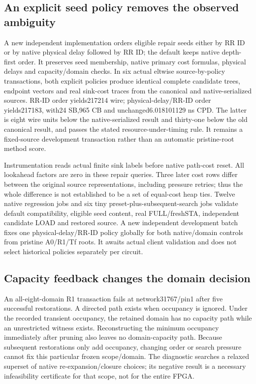 \documentclass[conference,10pt]{IEEEtran}
\begin{document}
\subsection{An explicit seed policy removes the observed ambiguity}
A new independent implementation orders eligible repair seeds either by RR ID or by native physical delay followed by RR ID; the default keeps native depth-first order. It preserves seed membership, native primary cost formulas, physical delays and capacity/domain checks. In six actual eltwise source-by-policy transactions, both explicit policies produce identical complete candidate trees, endpoint vectors and real sink-cost traces from the canonical and native-serialized sources. RR-ID order yields217214 wire; physical-delay/RR-ID order yields217183, with24 SB,965 CB and unchanged6.018101129 ns CPD. The latter is eight wire units below the native-serialized result and thirty-one below the old canonical result, and passes the stated resource-under-timing rule. It remains a fixed-source development transaction rather than an automatic pristine-root method score.

Instrumentation reads actual finite sink labels before native path-cost reset. All lookahead factors are zero in these repair queries. Three later cost rows differ between the original source representations, including pressure retries; thus the whole difference is not established to be a set of equal-cost heap ties. Twelve native regression jobs and six tiny preset-plus-subsequent-search jobs validate default compatibility, eligible seed content, real FULL/freshSTA, independent candidate LOAD and restored source. A new independent development batch fixes one physical-delay/RR-ID policy globally for both native/domain controls from pristine A0/R1/Tf roots. It awaits actual client validation and does not select historical policies separately per circuit.

\subsection{Capacity feedback changes the domain decision}
An all-eight-domain R1 transaction fails at network31767/pin1 after five successful restorations. A directed path exists when occupancy is ignored. Under the recorded transient occupancy, the retained domain has no capacity path while an unrestricted witness exists. Reconstructing the minimum occupancy immediately after pruning also leaves no domain-capacity path. Because subsequent restorations only add occupancy, changing order or search pressure cannot fix this particular frozen scope/domain. The diagnostic searches a relaxed superset of native re-expansion/closure choices; its negative result is a necessary infeasibility certificate for that scope, not for the entire FPGA.
\end{document}
